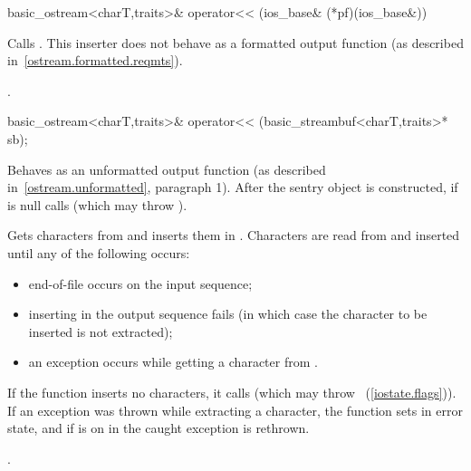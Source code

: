 %
%
\begin{itemdecl}
basic_ostream<charT,traits>& operator<<
    (ios_base& (*pf)(ios_base&))
\end{itemdecl}

\begin{itemdescr}
\pnum
\effects
Calls
.
This inserter does not
behave as a formatted output function (as described in~\ref{ostream.formatted.reqmts}).

\pnum
\returns
{}.
\end{itemdescr}

%
%
\begin{itemdecl}
basic_ostream<charT,traits>& operator<<
    (basic_streambuf<charT,traits>* sb);
\end{itemdecl}

\begin{itemdescr}
\pnum
\effects
Behaves as an unformatted output function (as described in~\ref{ostream.unformatted}, paragraph 1).
After the sentry object is
constructed, if
 is null calls
(which may throw
).

\pnum
Gets characters from 
and inserts them in
.
Characters are read from 
and inserted until any of the following occurs:
\begin{itemize}
\item
end-of-file occurs on the input sequence;
\item
inserting in the output sequence fails
(in which case the character to be inserted is not extracted);
\item
an exception occurs while getting a character from .
\end{itemize}

\pnum
If the function inserts no characters, it calls
(which may throw
~(\ref{iostate.flags})).
If an exception was thrown while extracting a character,
the function sets
in error state, and if
is on in
the caught exception is rethrown.

\pnum
\returns
{}.
\end{itemdescr}

